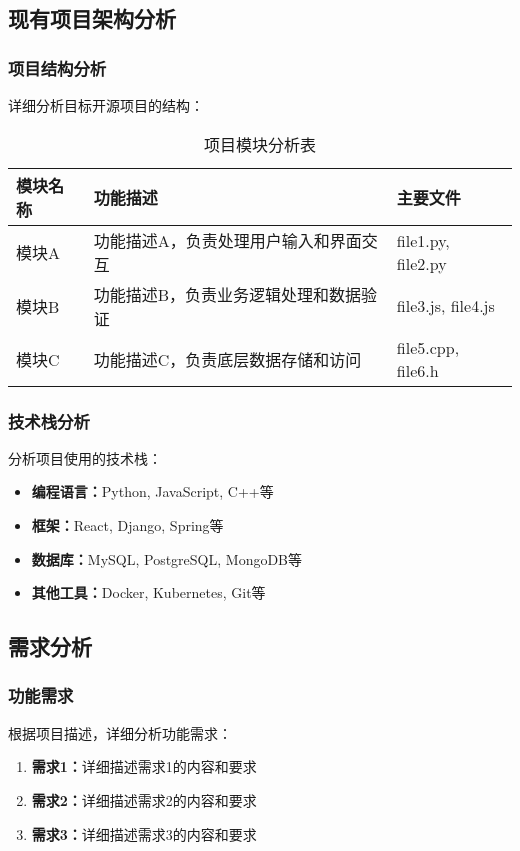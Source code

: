 \documentclass[a4paper,12pt]{article}
\begin{document}
\subsection{现有项目架构分析}

\subsubsection{项目结构分析}
详细分析目标开源项目的结构：

\begin{table}[H]
\centering
\begin{tabular}{|l|p{8cm}|l|}
\hline
\textbf{模块名称} & \textbf{功能描述} & \textbf{主要文件} \\
\hline
模块A & 功能描述A，负责处理用户输入和界面交互 & file1.py, file2.py \\
\hline
模块B & 功能描述B，负责业务逻辑处理和数据验证 & file3.js, file4.js \\
\hline
模块C & 功能描述C，负责底层数据存储和访问 & file5.cpp, file6.h \\
\hline
\end{tabular}
\caption{项目模块分析表}
\end{table}

\subsubsection{技术栈分析}
分析项目使用的技术栈：
\begin{itemize}
    \item \textbf{编程语言：}Python, JavaScript, C++等
    \item \textbf{框架：}React, Django, Spring等
    \item \textbf{数据库：}MySQL, PostgreSQL, MongoDB等
    \item \textbf{其他工具：}Docker, Kubernetes, Git等
\end{itemize}

\subsection{需求分析}

\subsubsection{功能需求}
根据项目描述，详细分析功能需求：

\begin{enumerate}
    \item \textbf{需求1：}详细描述需求1的内容和要求
    \item \textbf{需求2：}详细描述需求2的内容和要求
    \item \textbf{需求3：}详细描述需求3的内容和要求
\end{enumerate}
\end{document}
